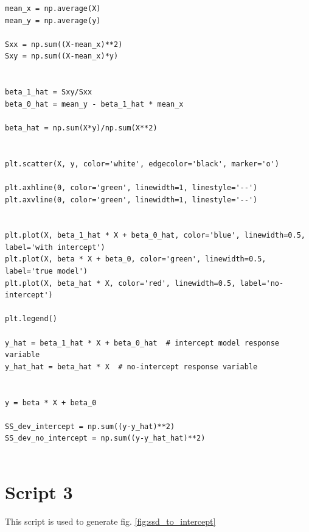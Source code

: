 \documentclass[12pt,a4paper,oneside]{book} %
\begin{document}
\begin{mdframed}[linecolor=black, topline=true, bottomline=true,
	leftline=false, rightline=false, backgroundcolor=yellow!20!white]
	\begin{verbatim}
mean_x = np.average(X)
mean_y = np.average(y)

Sxx = np.sum((X-mean_x)**2)
Sxy = np.sum((X-mean_x)*y)


beta_1_hat = Sxy/Sxx
beta_0_hat = mean_y - beta_1_hat * mean_x

beta_hat = np.sum(X*y)/np.sum(X**2) 


plt.scatter(X, y, color='white', edgecolor='black', marker='o')

plt.axhline(0, color='green', linewidth=1, linestyle='--')
plt.axvline(0, color='green', linewidth=1, linestyle='--')


plt.plot(X, beta_1_hat * X + beta_0_hat, color='blue', linewidth=0.5, label='with intercept')
plt.plot(X, beta * X + beta_0, color='green', linewidth=0.5, label='true model')
plt.plot(X, beta_hat * X, color='red', linewidth=0.5, label='no-intercept')

plt.legend()

y_hat = beta_1_hat * X + beta_0_hat  # intercept model response variable
y_hat_hat = beta_hat * X  # no-intercept response variable


y = beta * X + beta_0

SS_dev_intercept = np.sum((y-y_hat)**2)
SS_dev_no_intercept = np.sum((y-y_hat_hat)**2)


	\end{verbatim}
\end{mdframed}
	
	
	

\section{Script 3}
	
	This script is used to generate fig. \ref{fig:ssd_to_intercept}
	
\end{document}
